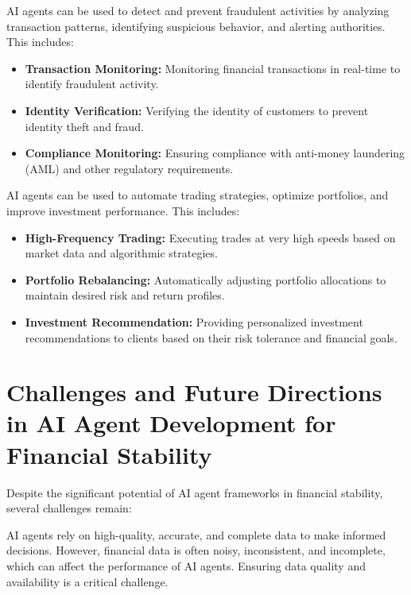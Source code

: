 \documentclass[a4paper,headinclude=on,footinclude=on,12pt,oneside]{scrbook}
\begin{document}

AI agents can be used to detect and prevent fraudulent activities by analyzing transaction patterns, identifying suspicious behavior, and alerting authorities. This includes:

\begin{itemize}
\item \textbf{Transaction Monitoring:} Monitoring financial transactions in real-time to identify fraudulent activity.
\item \textbf{Identity Verification:} Verifying the identity of customers to prevent identity theft and fraud.
\item \textbf{Compliance Monitoring:} Ensuring compliance with anti-money laundering (AML) and other regulatory requirements.
\end{itemize}


AI agents can be used to automate trading strategies, optimize portfolios, and improve investment performance. This includes:

\begin{itemize}
\item \textbf{High-Frequency Trading:} Executing trades at very high speeds based on market data and algorithmic strategies.
\item \textbf{Portfolio Rebalancing:} Automatically adjusting portfolio allocations to maintain desired risk and return profiles.
\item \textbf{Investment Recommendation:} Providing personalized investment recommendations to clients based on their risk tolerance and financial goals.
\end{itemize}

\section*{Challenges and Future Directions in AI Agent Development for Financial Stability}

Despite the significant potential of AI agent frameworks in financial stability, several challenges remain:


AI agents rely on high-quality, accurate, and complete data to make informed decisions. However, financial data is often noisy, inconsistent, and incomplete, which can affect the performance of AI agents. Ensuring data quality and availability is a critical challenge.
\end{document}
